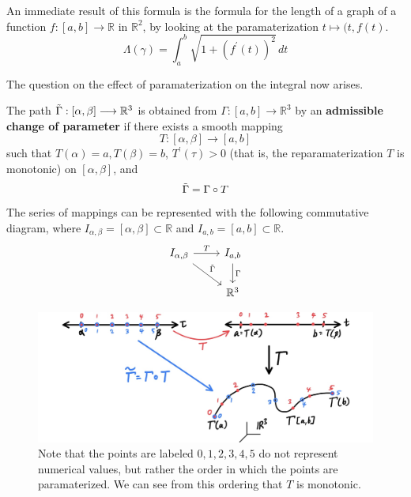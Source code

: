   \begin{corollary}
    An immediate result of this formula is the formula for the length of a graph of a function $f: [a, b] \longrightarrow \mathbb{R}$ in $\mathbb{R}^2$, by looking at the paramaterization $t \mapsto (t, f(t)$. 
    \begin{equation}
      \Lambda(\gamma) = \int_a^b \sqrt{1 + (f^\prime (t))^2}\,dt
    \end{equation}
  \end{corollary}

  The question on the effect of paramaterization on the integral now arises. 

  \begin{definition}
    The path $\Tilde{\Gamma}: [\alpha, \beta] \longrightarrow \mathbb{R}^3$ is obtained from $\Gamma: [a, b] \longrightarrow \mathbb{R}^3$ by an \textbf{admissible change of parameter} if there exists a smooth mapping 
    \[T: [\alpha, \beta] \longrightarrow [a, b]\]
    such that $T(\alpha) = a, T(\beta) = b$, $T^\prime (\tau) > 0$ (that is, the reparamaterization $T$ is monotonic) on $[\alpha, \beta]$, and 
    \[\Tilde{\Gamma} = \Gamma \circ T\]
    The series of mappings can be represented with the following commutative diagram, where $I_{\alpha, \beta} = [\alpha, \beta] \subset \mathbb{R}$ and $I_{a, b} = [a, b] \subset \mathbb{R}$. 
    \[
      \begin{tikzcd}
        I_{\alpha, \beta} \arrow{r}{T} \arrow{rd}{\Tilde{\Gamma}}& I_{a, b} \arrow{d}{\Gamma}\\
         & \mathbb{R}^3
      \end{tikzcd}
    \]

    \begin{figure}[H]
      \centering 
      \includegraphics[scale=0.25]{img/Admissible_Change_of_Parameter.jpg}
      \caption{Note that the points are labeled $0, 1, 2, 3, 4, 5$ do not represent numerical values, but rather the order in which the points are paramaterized. We can see from this ordering that $T$ is monotonic. } 
      \label{fig:Admissible_Change_of_Parameter}
    \end{figure}
  \end{definition}

